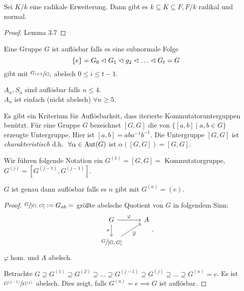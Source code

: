 \begin{corollary}
	Sei $K / k$ eine radikale Erweiterung. Dann gibt es $k \subseteq K \subseteq F, F / k$ radikal und normal.
\end{corollary}

\begin{proof}
	Lemma 3.7
\end{proof}

\begin{definition}[Algebra I]
	Eine Gruppe $G$ ist auflösbar falls es eine subnormale Folge
	\[
	\{e\} = G_0 \vartriangleleft G_1 \vartriangleleft g_2 \vartriangleleft \ldots \vartriangleleft G_{t} = G
	\]
	gibt mit $\sfrac{G_{i+1}}{G_{i}}$ abelsch $0 \leq i \leq t-1$.
\end{definition}

\begin{eg}[Algebra I]
	$A_{n},S_{n}$ sind auflösbar falls $n \leq 4$.\\
	$A_{n}$ ist einfach (nicht abelsch) $\forall n \geq 5$.
\end{eg}

Es gibt ein Kriterium für Auflösbarkeit, dass iterierte Kommutatorunterguppen benützt.
Für eine Gruppe $G$ bezeichnet $[G,G]$ die von $\{[a,b] \mid a,b \in G\} $ erzeugte Untergruppe.
Hier ist $[a,b] = a b a^{-1} b^{-1}$.
Die Untergruppe $[G,G]$ ist \emph{charakteristisch} d.h. $\forall \alpha \in \aut(G)$ ist $\alpha([G,G]) = [G,G]$.

Wir führen folgende Notation ein $G^{(1)} = [G,G] = $ Kommutatorgruppe, $G^{(j)} = [G^{(j-1)},G^{(j-1)}]$.
\begin{proposition}
	$G$ ist genau dann auflösbar falls es $n$ gibt mit $G^{(n)} = (e)$.
\end{proposition}

\begin{proof}
$\sfrac{G}{[G,G]} := G_{ab} = $ größte abelsche Quotient von $G$ in folgendem Sinn:
\[
\begin{tikzcd}
G \arrow[d, "\pi"'] \arrow[r, "\varphi"]             & A \\
{\sfrac{G}{[G,G]}} \arrow[ru, "\overline{\varphi}"'] &  
\end{tikzcd}
.\] 
$\varphi$ hom. und $A$ abelsch.

Betrachte $G \supseteq G^{(1)} \supseteq G^{(2)} \supseteq \ldots \supseteq G^{(j-1)} \supseteq G^{(j)} \supseteq \ldots \supseteq G^{(n)} = e$.
Es ist $\sfrac{G^{(j-1)}}{G^{(j)}}$ abelsch.
Dies zeigt, falls $G^{(n)} = e \implies G$ ist auflösbar.
\end{proof}

